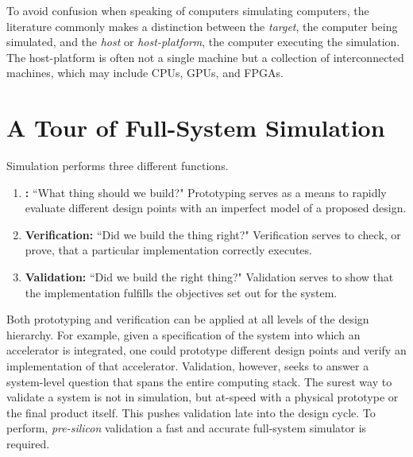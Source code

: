 To avoid confusion when speaking of computers simulating computers, the
literature commonly makes a distinction between the \emph{target}, the computer
being simulated, and the \emph{host} or \emph{host-platform}, the computer
executing the simulation. The host-platform is often not a single machine but
a collection of interconnected machines, which may include CPUs,
GPUs, and FPGAs.

\section{A Tour of Full-System Simulation}

Simulation performs three different functions.

\begin{enumerate}

    \item \textbf{:} ``What thing should we
        build?" Prototyping serves as a means to rapidly evaluate different
        design points with an imperfect model of a proposed design.

    \item \textbf{Verification:} ``Did we build the thing right?" Verification
        serves to check, or prove, that a particular implementation
        correctly executes.

    \item \textbf{Validation:} ``Did we build the right thing?" Validation
        serves to show that the implementation fulfills the objectives set out
        for the system.

\end{enumerate}

Both prototyping and verification can be applied at all levels of the design
hierarchy.  For example, given a specification of the system into which an
accelerator is integrated, one could prototype different design points and
verify an implementation of that accelerator. Validation, however, seeks to
answer a system-level question that spans the entire computing stack.  The
surest way to validate a system is not in simulation, but at-speed with a
physical prototype or the final product itself. This pushes validation late
into the design cycle. To perform, \emph{pre-silicon} validation a fast and
accurate full-system simulator is required.


